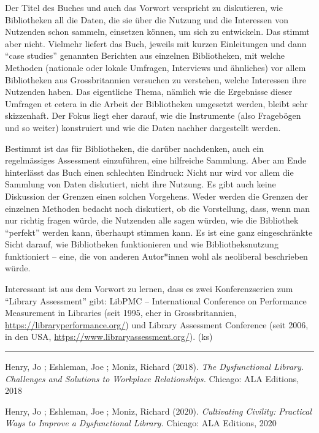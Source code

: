 \documentclass[a4paper,
fontsize=11pt,
oneside,
numbers=noperiodatend,
parskip=half-,
bibliography=totoc,
final
]{scrartcl}
\begin{document}
Der Titel des Buches und auch das Vorwort verspricht zu diskutieren, wie
Bibliotheken all die Daten, die sie über die Nutzung und die Interessen
von Nutzenden schon sammeln, einsetzen können, um sich zu entwickeln.
Das stimmt aber nicht. Vielmehr liefert das Buch, jeweils mit kurzen
Einleitungen und dann \enquote{case studies} genannten Berichten aus
einzelnen Bibliotheken, mit welche Methoden (nationale oder lokale
Umfragen, Interviews und ähnliches) vor allem Bibliotheken aus
Grossbritannien versuchen zu verstehen, welche Interessen ihre Nutzenden
haben. Das eigentliche Thema, nämlich wie die Ergebnisse dieser Umfragen
et cetera in die Arbeit der Bibliotheken umgesetzt werden, bleibt sehr
skizzenhaft. Der Fokus liegt eher darauf, wie die Instrumente (also
Fragebögen und so weiter) konstruiert und wie die Daten nachher
dargestellt werden.

Bestimmt ist das für Bibliotheken, die darüber nachdenken, auch ein
regelmässiges Assessment einzuführen, eine hilfreiche Sammlung. Aber am
Ende hinterlässt das Buch einen schlechten Eindruck: Nicht nur wird vor
allem die Sammlung von Daten diskutiert, nicht ihre Nutzung. Es gibt
auch keine Diskussion der Grenzen einen solchen Vorgehens. Weder werden
die Grenzen der einzelnen Methoden bedacht noch diskutiert, ob die
Vorstellung, dass, wenn man nur richtig fragen würde, die Nutzenden alle
sagen würden, wie die Bibliothek \enquote{perfekt} werden kann,
überhaupt stimmen kann. Es ist eine ganz eingeschränkte Sicht darauf,
wie Bibliotheken funktionieren und wie Bibliotheksnutzung funktioniert
-- eine, die von anderen Autor*innen wohl als neoliberal beschrieben
würde.

Interessant ist aus dem Vorwort zu lernen, dass es zwei Konferenzserien
zum \enquote{Library Assessment} gibt: LibPMC -- International
Conference on Performance Measurement in Libraries (seit 1995, eher in
Grossbritannien, \url{https://libraryperformance.org/}) und Library
Assessment Conference (seit 2006, in den USA,
\url{https://www.libraryassessment.org/}). (ks)

\begin{center}\rule{0.5\linewidth}{0.5pt}\end{center}

Henry, Jo ; Eshleman, Joe ; Moniz, Richard (2018). \emph{The
Dysfunctional Library. Challenges and Solutions to Workplace
Relationships.} Chicago: ALA Editions, 2018

Henry, Jo ; Eshleman, Joe ; Moniz, Richard (2020). \emph{Cultivating
Civility: Practical Ways to Improve a Dysfunctional Library.} Chicago:
ALA Editions, 2020
\end{document}
